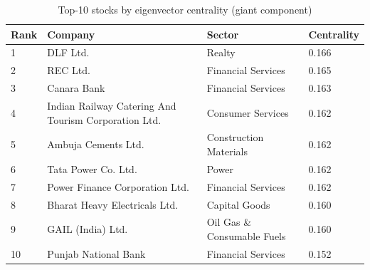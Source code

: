 \begin{table}[!ht]
\centering
\caption{Top-10 stocks by eigenvector centrality (giant component)}
\label{tab:top10-eigenvector}
\begin{tabular}{llll}
\toprule
Rank & Company & Sector & Centrality \\
\midrule
1 & DLF Ltd. & Realty & 0.166 \\
2 & REC Ltd. & Financial Services & 0.165 \\
3 & Canara Bank & Financial Services & 0.163 \\
4 & Indian Railway Catering And Tourism Corporation Ltd. & Consumer Services & 0.162 \\
5 & Ambuja Cements Ltd. & Construction Materials & 0.162 \\
6 & Tata Power Co. Ltd. & Power & 0.162 \\
7 & Power Finance Corporation Ltd. & Financial Services & 0.162 \\
8 & Bharat Heavy Electricals Ltd. & Capital Goods & 0.160 \\
9 & GAIL (India) Ltd. & Oil Gas \& Consumable Fuels & 0.160 \\
10 & Punjab National Bank & Financial Services & 0.152 \\
\bottomrule
\end{tabular}
\end{table}
